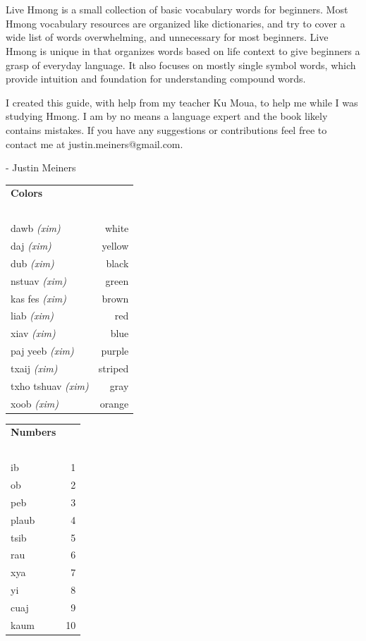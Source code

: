 \documentclass{article}
\begin{document}
\section*{}
Live Hmong is a small collection of basic vocabulary words for beginners.
Most Hmong vocabulary resources are organized like dictionaries, and try to cover a wide list of words overwhelming, and unnecessary for most beginners.
Live Hmong is unique in that organizes words based on life context to give beginners a grasp of everyday language.
 It also focuses on mostly single symbol words, which provide intuition and foundation for understanding compound words.

I created this guide, with help from my teacher Ku Moua, to help me while I was studying Hmong.
I am by no means a language expert and the book likely contains mistakes. If you have any suggestions or contributions feel free to contact me at justin.meiners@gmail.com.

\hfill - Justin Meiners

\clearpage


\begin{multicols}{2}
[
\section*{}
]

\begin{tabular}{l r}
\textbf{Colors} \\
~\\

dawb {\em (xim)} &white\\
daj {\em (xim)} &yellow\\
dub {\em (xim)} &black\\
nstuav {\em (xim)} &green\\
kas fes {\em (xim)} &brown\\
liab {\em (xim)} &red\\
xiav {\em (xim)} &blue\\
paj yeeb {\em (xim)} &purple\\
txaij {\em (xim)} &striped\\
txho tshuav {\em (xim)} &gray\\
xoob {\em (xim)} &orange\\
\end{tabular}

\begin{tabular}{l r}
\textbf{Numbers} \\
~\\
ib &1\\
ob &2\\
peb &3\\
plaub &4\\
tsib &5\\
rau &6\\
xya &7\\
yi &8\\
cuaj &9\\
kaum &10\\
\end{tabular}
\end{multicols}
\end{document}
